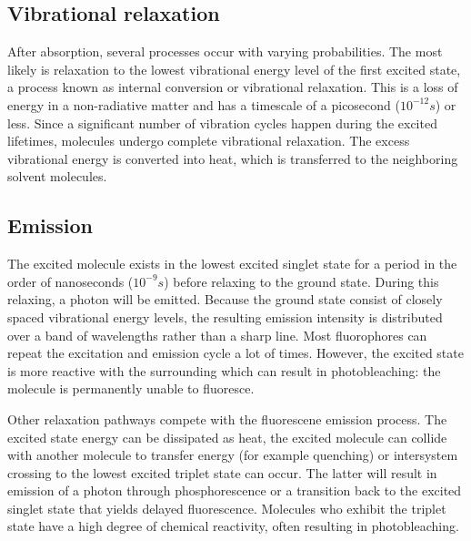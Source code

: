 \documentclass[twoside,single]{lion-msc}
\begin{document}
\subsection{Vibrational relaxation}
After absorption, several processes occur with varying probabilities. The most likely is relaxation to the lowest vibrational energy level of the first excited state, a process known as internal conversion or vibrational relaxation. This is a loss of energy in a non-radiative matter and has a timescale of a picosecond ($10^{-12}s$) or less. Since a significant number of vibration cycles happen during the excited lifetimes, molecules undergo complete vibrational relaxation. The excess vibrational energy is converted into heat, which is transferred to the neighboring solvent molecules.

\subsection{Emission}
The excited molecule exists in the lowest excited singlet state for a period in the order of nanoseconds ($10^{-9}s$) before relaxing to the ground state. During this relaxing, a photon will be emitted. Because the ground state consist of closely spaced vibrational energy levels, the resulting emission intensity is distributed over a band of wavelengths rather than a sharp line. Most fluorophores can repeat the excitation and emission cycle a lot of times. However, the excited state is more reactive with the surrounding which can result in photobleaching: the molecule is permanently unable to fluoresce. 

Other relaxation pathways compete with the fluorescene emission process. The excited state energy can be dissipated as heat, the excited molecule can collide with another molecule to transfer energy (for example quenching) or intersystem crossing to the lowest excited triplet state can occur. The latter will result in emission of a photon through phosphorescence or a transition back to the excited singlet state that yields delayed fluorescence. Molecules who exhibit the triplet state have a high degree of chemical reactivity, often resulting in photobleaching. 
\end{document}
